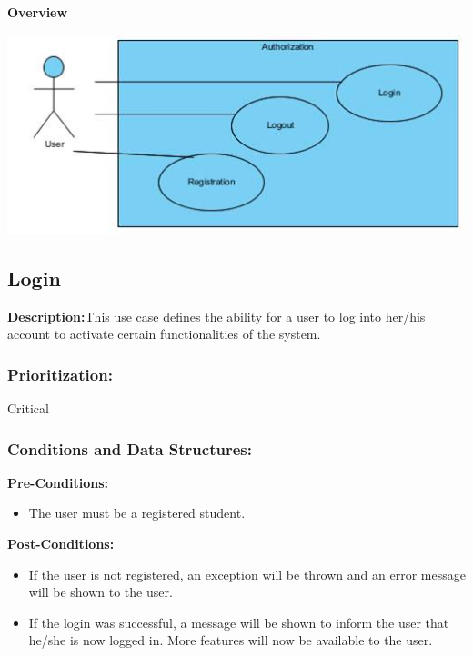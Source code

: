 \documentclass[a4paper,11pt]{article}
\begin{document}

\textbf{Overview}\\
\begin{center}
\includegraphics[width=1\linewidth]{./Images/OverviewDiagrams/AuthorizationOverview.jpg}\\
\end{center}
\subsection{Login}
\textbf{Description:}This use case defines the ability for a user to log into her/his account to activate certain functionalities of the system.
\subsubsection{Prioritization:}Critical
\subsubsection{Conditions and Data Structures:}
\textbf{Pre-Conditions:}
\begin{itemize}
	\item The user must be a registered student.
\end{itemize}
\textbf{Post-Conditions:}
\begin{itemize}
	\item If the user is not registered, an exception will be thrown and an error message will be shown to the user.
	\item If the login was successful, a message will be shown to inform the user that he/she is now logged in. More features will now be available to the user.
\end{itemize}
\end{document}
